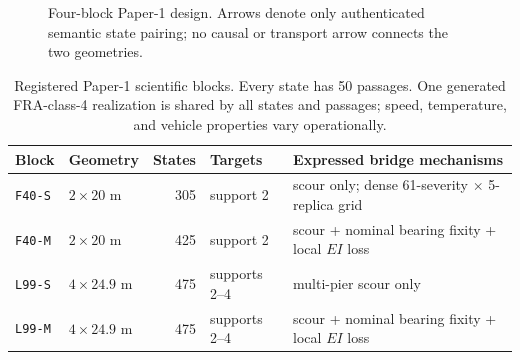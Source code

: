 \begin{figure}[htbp]
\centering
{}
\caption{Four-block Paper-1 design. Arrows denote only authenticated semantic
state pairing; no causal or transport arrow connects the two geometries.}
\label{fig:stage_graph}
\end{figure}

\begin{table}[htbp]
\centering
\caption{Registered Paper-1 scientific blocks. Every state has 50 passages.
One generated FRA-class-4 realization is shared by all states and passages;
speed, temperature, and vehicle properties vary operationally.}
\label{tab:stages}
\small
\setlength{\tabcolsep}{4pt}
\begin{tabular}{llrlp{5.8cm}}
\toprule
Block & Geometry & States & Targets & Expressed bridge mechanisms \\
\midrule
\texttt{F40-S} & $2\times20$ m & 305 & support 2 & scour only; dense 61-severity $\times$ 5-replica grid \\
\texttt{F40-M} & $2\times20$ m & 425 & support 2 & scour + nominal bearing fixity + local $EI$ loss \\
\texttt{L99-S} & $4\times24.9$ m & 475 & supports 2--4 & multi-pier scour only \\
\texttt{L99-M} & $4\times24.9$ m & 475 & supports 2--4 & scour + nominal bearing fixity + local $EI$ loss \\
\bottomrule
\end{tabular}
\end{table}

